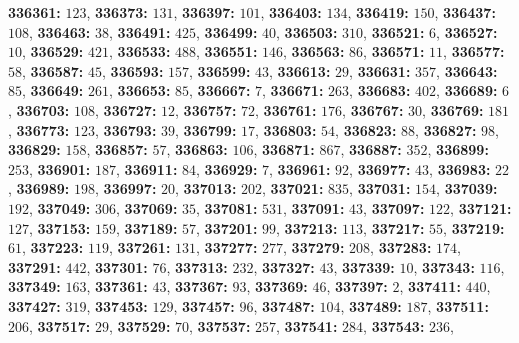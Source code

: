 \textsf{\bfseries 336361:} $123$, \textsf{\bfseries 336373:} $131$, \textsf{\bfseries 336397:} $101$, \textsf{\bfseries 336403:} $134$, \textsf{\bfseries 336419:} $150$, \textsf{\bfseries 336437:} $108$, \textsf{\bfseries 336463:} $38$, \textsf{\bfseries 336491:} $425$, \textsf{\bfseries 336499:} $40$, \textsf{\bfseries 336503:} $310$, \textsf{\bfseries 336521:} $6$, \textsf{\bfseries 336527:} $10$, \textsf{\bfseries 336529:} $421$, \textsf{\bfseries 336533:} $488$, \textsf{\bfseries 336551:} $146$, \textsf{\bfseries 336563:} $86$, \textsf{\bfseries 336571:} $11$, \textsf{\bfseries 336577:} $58$, \textsf{\bfseries 336587:} $45$, \textsf{\bfseries 336593:} $157$, \textsf{\bfseries 336599:} $43$, \textsf{\bfseries 336613:} $29$, \textsf{\bfseries 336631:} $357$, \textsf{\bfseries 336643:} $85$, \textsf{\bfseries 336649:} $261$, \textsf{\bfseries 336653:} $85$, \textsf{\bfseries 336667:} $7$, \textsf{\bfseries 336671:} $263$, \textsf{\bfseries 336683:} $402$, \textsf{\bfseries 336689:} $6$, \textsf{\bfseries 336703:} $108$, \textsf{\bfseries 336727:} $12$, \textsf{\bfseries 336757:} $72$, \textsf{\bfseries 336761:} $176$, \textsf{\bfseries 336767:} $30$, \textsf{\bfseries 336769:} $181$, \textsf{\bfseries 336773:} $123$, \textsf{\bfseries 336793:} $39$, \textsf{\bfseries 336799:} $17$, \textsf{\bfseries 336803:} $54$, \textsf{\bfseries 336823:} $88$, \textsf{\bfseries 336827:} $98$, \textsf{\bfseries 336829:} $158$, \textsf{\bfseries 336857:} $57$, \textsf{\bfseries 336863:} $106$, \textsf{\bfseries 336871:} $867$, \textsf{\bfseries 336887:} $352$, \textsf{\bfseries 336899:} $253$, \textsf{\bfseries 336901:} $187$, \textsf{\bfseries 336911:} $84$, \textsf{\bfseries 336929:} $7$, \textsf{\bfseries 336961:} $92$, \textsf{\bfseries 336977:} $43$, \textsf{\bfseries 336983:} $22$, \textsf{\bfseries 336989:} $198$, \textsf{\bfseries 336997:} $20$, \textsf{\bfseries 337013:} $202$, \textsf{\bfseries 337021:} $835$, \textsf{\bfseries 337031:} $154$, \textsf{\bfseries 337039:} $192$, \textsf{\bfseries 337049:} $306$, \textsf{\bfseries 337069:} $35$, \textsf{\bfseries 337081:} $531$, \textsf{\bfseries 337091:} $43$, \textsf{\bfseries 337097:} $122$, \textsf{\bfseries 337121:} $127$, \textsf{\bfseries 337153:} $159$, \textsf{\bfseries 337189:} $57$, \textsf{\bfseries 337201:} $99$, \textsf{\bfseries 337213:} $113$, \textsf{\bfseries 337217:} $55$, \textsf{\bfseries 337219:} $61$, \textsf{\bfseries 337223:} $119$, \textsf{\bfseries 337261:} $131$, \textsf{\bfseries 337277:} $277$, \textsf{\bfseries 337279:} $208$, \textsf{\bfseries 337283:} $174$, \textsf{\bfseries 337291:} $442$, \textsf{\bfseries 337301:} $76$, \textsf{\bfseries 337313:} $232$, \textsf{\bfseries 337327:} $43$, \textsf{\bfseries 337339:} $10$, \textsf{\bfseries 337343:} $116$, \textsf{\bfseries 337349:} $163$, \textsf{\bfseries 337361:} $43$, \textsf{\bfseries 337367:} $93$, \textsf{\bfseries 337369:} $46$, \textsf{\bfseries 337397:} $2$, \textsf{\bfseries 337411:} $440$, \textsf{\bfseries 337427:} $319$, \textsf{\bfseries 337453:} $129$, \textsf{\bfseries 337457:} $96$, \textsf{\bfseries 337487:} $104$, \textsf{\bfseries 337489:} $187$, \textsf{\bfseries 337511:} $206$, \textsf{\bfseries 337517:} $29$, \textsf{\bfseries 337529:} $70$, \textsf{\bfseries 337537:} $257$, \textsf{\bfseries 337541:} $284$, \textsf{\bfseries 337543:} $236$, 

